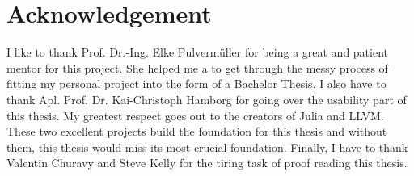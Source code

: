 \section{Acknowledgement}

I like to thank Prof. Dr.-Ing. Elke Pulvermüller for being a great and patient mentor for this project.
She helped me a to get through the messy process of fitting my personal project into the form of a Bachelor Thesis.
I also have to thank Apl. Prof. Dr. Kai-Christoph Hamborg for going over the usability part of this thesis.
My greatest respect goes out to the creators of Julia and LLVM. 
These two excellent projects build the foundation for this thesis and without them, this thesis would miss its most crucial foundation.
Finally, I have to thank Valentin Churavy and Steve Kelly for the tiring task of proof reading this thesis.
